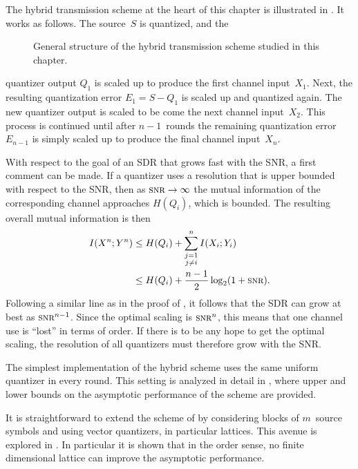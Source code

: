 The hybrid transmission scheme at the heart of this chapter is illustrated in
. It works as follows. The source~$S$ is quantized, and the
\begin{figure}[tbp]
  \begin{center}
    
  \end{center}
  \caption{General structure of the hybrid transmission scheme studied in this
  chapter.}
  \label{fig:qeschemegen}
\end{figure}
quantizer output $Q_1$ is scaled up to produce the first channel input~$X_1$.
Next, the resulting quantization error $E_1 = S - Q_1$ is scaled up and
quantized again. The new quantizer output is scaled to be come the next channel
input~$X_2$. This process is continued until after $n-1$~rounds the remaining
quantization error~$E_{n-1}$ is simply scaled up to produce the final channel
input~$X_n$. 

With respect to the goal of an SDR that grows fast with the SNR, a first
comment can be made. If a quantizer uses a resolution that is upper
bounded with respect to the SNR, then as $\snr \goesto \infty$ the mutual
information of the corresponding channel approaches $H(Q_i)$, which is bounded.
The resulting overall mutual information is then
\begin{align*}
  I(X^n; Y^n) &\le H(Q_i) + \sum_{\substack{j = 1 \\ j \ne i}}^n I(X_i; Y_i) \\
  &\le H(Q_i) + \frac{n-1}{2} \log_2(1 + \snr).
\end{align*}
Following a similar line as in the proof of , it follows that the
SDR can grow at best as $\snr^{n-1}$. Since the optimal scaling is $\snr^n$,
this means that one channel use is ``lost'' in terms of order.  If there is to
be any hope to get the optimal scaling, the resolution of all quantizers must
therefore grow with the SNR.

The simplest implementation of the hybrid scheme uses the same uniform quantizer
in every round. This setting is analyzed in detail in ,
where upper and lower bounds on the asymptotic performance of the scheme are
provided. 

It is straightforward to extend the scheme of  by
considering blocks of $m$~source symbols and using vector quantizers, in
particular lattices. This avenue is explored in . In
particular it is shown that in the order sense, no finite dimensional lattice
can improve the asymptotic performance. 

